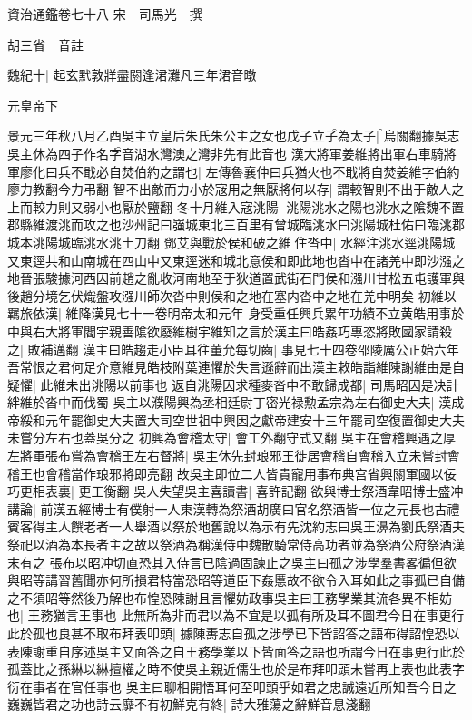 資治通鑑卷七十八
宋　司馬光　撰

胡三省　音註

魏紀十|{
	起玄黓敦牂盡閼逢涒灘凡三年涒音暾}


元皇帝下

景元三年秋八月乙酉吳主立皇后朱氏朱公主之女也戊子立子為太子|{
	烏關翻據吳志吳主休為四子作名字音湖水灣澳之灣非先有此音也}
漢大將軍姜維將出軍右車騎將軍廖化曰兵不戢必自焚伯約之謂也|{
	左傳魯襄仲曰兵猶火也不戢將自焚姜維字伯約廖力教翻今力弔翻}
智不出敵而力小於宼用之無厭將何以存|{
	謂較智則不出于敵人之上而較力則又弱小也厭於鹽翻}
冬十月維入宼洮陽|{
	洮陽洮水之陽也洮水之隂魏不置郡縣維渡洮而攻之也沙州記曰嵹城東北三百里有曾城臨洮水曰洮陽城杜佑曰臨洮郡城本洮陽城臨洮水洮土刀翻}
鄧艾與戰於侯和破之維住沓中|{
	水經注洮水逕洮陽城又東逕共和山南城在四山中又東逕迷和城北意侯和即此地也沓中在諸羌中即沙漒之地晉張駿據河西因前趙之亂收河南地至于狄道置武街石門侯和漒川甘松五屯護軍與後趙分境乞伏熾盤攻漒川師次沓中則侯和之地在塞内沓中之地在羌中明矣}
初維以羈旅依漢|{
	維降漢見七十一卷明帝太和元年}
身受重任興兵累年功績不立黄皓用事於中與右大將軍閻宇親善隂欲廢維樹宇維知之言於漢主曰皓姦巧專恣將敗國家請殺之|{
	敗補邁翻}
漢主曰皓趨走小臣耳往董允每切齒|{
	事見七十四卷邵陵厲公正始六年}
吾常恨之君何足介意維見皓枝附葉連懼於失言遜辭而出漢主敕皓詣維陳謝維由是自疑懼|{
	此維未出洮陽以前事也}
返自洮陽因求種麥沓中不敢歸成都|{
	司馬昭因是决計絆維於沓中而伐蜀}
吳主以濮陽興為丞相廷尉丁密光禄勲孟宗為左右御史大夫|{
	漢成帝綏和元年罷御史大夫置大司空世祖中興因之獻帝建安十三年罷司空復置御史大夫未嘗分左右也蓋吳分之}
初興為會稽太守|{
	會工外翻守式又翻}
吳主在會稽興遇之厚左將軍張布嘗為會稽王左右督將|{
	吳主休先封琅邪王徙居會稽自會稽入立未嘗封會稽王也會稽當作琅邪將即亮翻}
故吳主即位二人皆貴寵用事布典宫省興關軍國以佞巧更相表裏|{
	更工衡翻}
吳人失望吳主喜讀書|{
	喜許記翻}
欲與博士祭酒韋昭博士盛冲講論|{
	前漢五經博士有僕射一人東漢轉為祭酒胡廣曰官名祭酒皆一位之元長也古禮賓客得主人饌老者一人舉酒以祭於地舊說以為示有先沈約志曰吳王濞為劉氏祭酒夫祭祀以酒為本長者主之故以祭酒為稱漢侍中魏散騎常侍高功者並為祭酒公府祭酒漢末有之}
張布以昭冲切直恐其入侍言已隂過固諫止之吳主曰孤之涉學羣書畧徧但欲與昭等講習舊聞亦何所損君特當恐昭等道臣下姦慝故不欲令入耳如此之事孤已自備之不須昭等然後乃解也布惶恐陳謝且言懼妨政事吳主曰王務學業其流各異不相妨也|{
	王務猶言王事也}
此無所為非而君以為不宜是以孤有所及耳不圖君今日在事更行此於孤也良甚不取布拜表叩頭|{
	據陳夀志自孤之涉學已下皆詔答之語布得詔惶恐以表陳謝重自序述吳主又面答之自王務學業以下皆面答之語也所謂今日在事更行此於孤蓋比之孫綝以綝擅權之時不使吳主親近儒生也於是布拜叩頭未嘗再上表也此表字衍在事者在官任事也}
吳主曰聊相開悟耳何至叩頭乎如君之忠誠遠近所知吾今日之巍巍皆君之功也詩云靡不有初鮮克有終|{
	詩大雅蕩之辭鮮音息淺翻}
